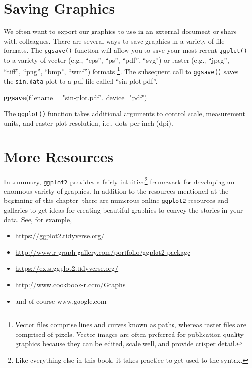 \documentclass[
]{krantz}
\makeatletter
\newenvironment{Shaded}{\begin{snugshade}}{\end{snugshade}}
\newcommand{\DataTypeTok}[1]{\textcolor[rgb]{0.27,0.27,0.27}{#1}}
\newcommand{\KeywordTok}[1]{\textcolor[rgb]{0.27,0.27,0.27}{\textbf{#1}}}
\newcommand{\NormalTok}[1]{#1}
\newcommand{\StringTok}[1]{\textcolor[rgb]{0.5,0.5,0.5}{#1}}
\providecommand{\tightlist}{%
  \setlength{\itemsep}{0pt}\setlength{\parskip}{0pt}}
\newenvironment{kframe}{%
\medskip{}
\setlength{\fboxsep}{.8em}
 \def\at@end@of@kframe{}%
 \ifinner\ifhmode%
  \def\at@end@of@kframe{\end{minipage}}%
  \begin{minipage}{\columnwidth}%
 \fi\fi%
 \def\FrameCommand##1{\hskip\@totalleftmargin \hskip-\fboxsep
 \colorbox{shadecolor}{##1}\hskip-\fboxsep
     \hskip-\linewidth \hskip-\@totalleftmargin \hskip\columnwidth}%
 \MakeFramed {\advance\hsize-\width
   \@totalleftmargin\z@ \linewidth\hsize
   \@setminipage}}%
 {\par\unskip\endMakeFramed%
 \at@end@of@kframe}
\renewenvironment{Shaded}{\begin{kframe}}{\end{kframe}}
\makeatother
\begin{document}
\hypertarget{saving-graphics}{%
\section{Saving Graphics}\label{saving-graphics}}

We often want to export our graphics to use in an external document or share with colleagues. There are several ways to save graphics in a variety of file formats. The \texttt{ggsave()} function will allow you to save your most recent \texttt{ggplot()} to a variety of vector (e.g., ``eps'', ``ps'', ``pdf'', ``svg'') or raster (e.g., ``jpeg'', ``tiff'', ``png'', ``bmp'', ``wmf'') formats \footnote{Vector files comprise lines and curves known as paths, whereas raster files are comprised of pixels. Vector images are often preferred for publication quality graphics because they can be edited, scale well, and provide crisper detail.}. The subsequent call to \texttt{ggsave()} saves the \texttt{sin.data} plot to a pdf file called ``sin-plot.pdf''.

\begin{Shaded}
\begin{Highlighting}[]
\KeywordTok{ggsave}\NormalTok{(}\DataTypeTok{filename =} \StringTok{"sin{-}plot.pdf"}\NormalTok{, }\DataTypeTok{device=}\StringTok{"pdf"}\NormalTok{)}
\end{Highlighting}
\end{Shaded}

The \texttt{ggplot()} function takes additional arguments to control scale, measurement units, and raster plot resolution, i.e., dots per inch (dpi).

\hypertarget{more-resources}{%
\section{More Resources}\label{more-resources}}

In summary, \texttt{ggplot2} provides a fairly intuitive\footnote{Like everything else in this book, it takes practice to get used to the syntax.} framework for developing an enormous variety of graphics. In addition to the resources mentioned at the beginning of this chapter, there are numerous online \texttt{ggplot2} resources and galleries to get ideas for creating beautiful graphics to convey the stories in your data. See, for example,

\begin{itemize}
\tightlist
\item
  \url{https://ggplot2.tidyverse.org/}
\item
  \url{http://www.r-graph-gallery.com/portfolio/ggplot2-package}
\item
  \url{https://exts.ggplot2.tidyverse.org/}
\item
  \url{http://www.cookbook-r.com/Graphs}
\item
  and of course www.google.com
\end{itemize}
\end{document}
